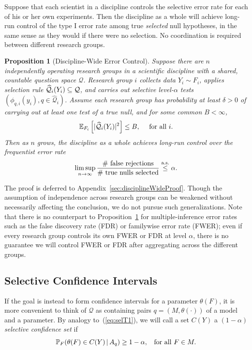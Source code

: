 \documentclass{article}
\newtheorem{proposition}[theorem]{Proposition}
\theoremstyle{definition}
\newcommand{\cQ}{\mathcal{Q}}
\newcommand{\hcQ}{\widehat{\mathcal{Q}}}
\newcommand{\leqAS}{\overset{\textrm{a.s.}}{\leq}}
\begin{document}
Suppose that each scientist in a discipline controls the selective error rate for each of his or her own experiments. Then the discipline as a whole will achieve long-run control of the type I error rate among true {\em selected} null hypotheses, in the same sense as they would if there were no selection. No coordination is required between different research groups.
\begin{proposition}[Discipline-Wide Error Control]\label{prop:disciplineWide}
Suppose there are $n$ independently operating research groups in a scientific discipline with a shared, countable question space $\cQ$. Research group $i$ collects data $Y_{i}\sim F_{i}$, applies selection rule $\hcQ_{i}(Y_{i})\sub \cQ$, and carries out selective level-$\alpha$ tests $(\phi_{q,i}(y_{i}), q\in\hcQ_{i})$.
Assume each research group has probability at least $\delta>0$ of carrying out at least one test of a true null, and for some common $B<\infty$,
\[\E_{F_{i}}\left[|\hcQ_{i}(Y_{i})|^2\right] \leq B,
\quad\text{ for all } i.\]
Then as $n$ grows, the discipline as a whole achieves long-run control over the frequentist error rate
\begin{equation}\label{eq:longRun}
  \limsup_{n\to\infty} \frac{\textnormal{\# false rejections}}{\textnormal{\# true nulls selected}} \leqAS \alpha.
\end{equation}
\end{proposition}
The proof is deferred to Appendix~\ref{sec:disciplineWideProof}. Though the assumption of independence across research groups can be weakened without necessarily affecting the conclusion, we do not pursue such generalizations. Note that there is no counterpart to Proposition~\ref{prop:disciplineWide} for multiple-inference error rates such as the false discovery rate (FDR) \citep{benjamini1995controlling} or familywise error rate (FWER); even if every research group controls its own FWER or FDR at level $\alpha$, there is no guarantee we will control FWER or FDR after aggregating across the different groups.


\subsection{Selective Confidence Intervals}\label{sec:ci}

If the goal is instead to form confidence intervals for a parameter $\theta(F)$, it is more convenient to think of $\cQ$ as containing pairs $q = (M, \theta(\cdot))$ of a model and a parameter. By analogy to~(\ref{eq:selT1}), we will call a set $C(Y)$ a {\em $(1-\alpha)$ selective confidence set} if
\begin{equation}\label{eq:selConf}
  \mathbb{P}_F(\theta(F) \in C(Y) \,|\, A_q) \geq 1 - \alpha, \;\;\text{ for all } F\in M.
\end{equation}
\end{document}
